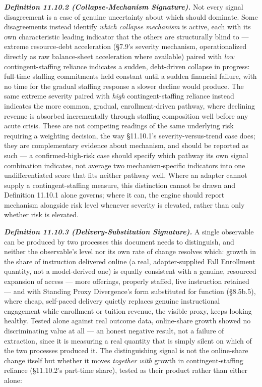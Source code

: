 \documentclass[
]{article}
\begin{document}
\emph{\textbf{Definition 11.10.2 (Collapse-Mechanism Signature).}} Not
every signal disagreement is a case of genuine uncertainty about which
should dominate. Some disagreements instead identify \emph{which
collapse mechanism} is active, each with its own characteristic leading
indicator that the others are structurally blind to --- extreme
resource-debt acceleration (§7.9's severity mechanism, operationalized
directly as raw balance-sheet acceleration where available) paired with
\emph{low} contingent-staffing reliance indicates a sudden, debt-driven
collapse in progress: full-time staffing commitments held constant until
a sudden financial failure, with no time for the gradual staffing
response a slower decline would produce. The same extreme severity
paired with \emph{high} contingent-staffing reliance instead indicates
the more common, gradual, enrollment-driven pathway, where declining
revenue is absorbed incrementally through staffing composition well
before any acute crisis. These are not competing readings of the same
underlying risk requiring a weighting decision, the way §11.10.1's
severity-versus-trend case does; they are complementary evidence about
mechanism, and should be reported as such --- a confirmed-high-risk case
should specify which pathway its own signal combination indicates, not
average two mechanism-specific indicators into one undifferentiated
score that fits neither pathway well. Where an adapter cannot supply a
contingent-staffing measure, this distinction cannot be drawn and
Definition 11.10.1 alone governs; where it can, the engine should report
mechanism alongside risk level whenever severity is elevated, rather
than only whether risk is elevated.

\emph{\textbf{Definition 11.10.3 (Delivery-Substitution Signature).}} A
single observable can be produced by two processes this document needs
to distinguish, and neither the observable's level nor its own rate of
change resolves which: growth in the share of instruction delivered
online (a real, adapter-supplied Fall Enrollment quantity, not a
model-derived one) is equally consistent with a genuine, resourced
expansion of access --- more offerings, properly staffed, live
instruction retained --- and with Standing Proxy Divergence's form
substituted for function (§8.5b.5), where cheap, self-paced delivery
quietly replaces genuine instructional engagement while enrollment or
tuition revenue, the visible proxy, keeps looking healthy. Tested alone
against real outcome data, online-share growth showed no discriminating
value at all --- an honest negative result, not a failure of extraction,
since it is measuring a real quantity that is simply silent on which of
the two processes produced it. The distinguishing signal is not the
online-share change itself but whether it moves \emph{together with}
growth in contingent-staffing reliance (§11.10.2's part-time share),
tested as their product rather than either alone:
\end{document}
